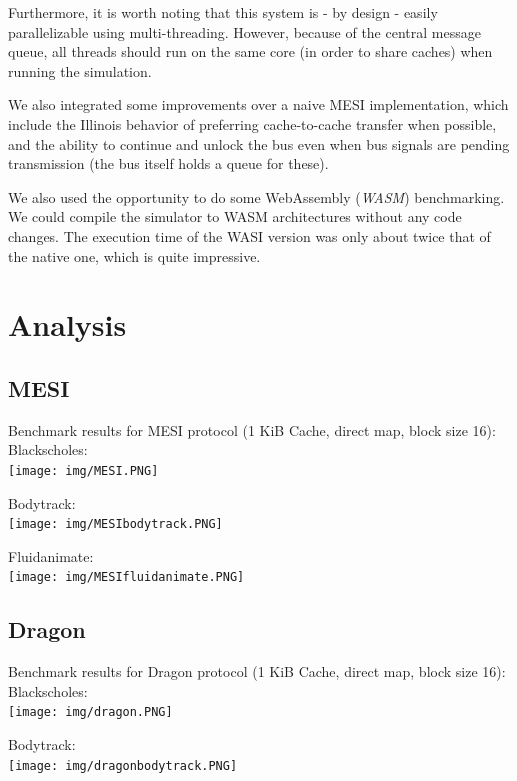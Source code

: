 \documentclass{article}
\begin{document}
\begin{multicols}{2}
Furthermore, it is worth noting that this system is - by design - easily parallelizable using multi-threading. However, because of the central message queue, all threads should run on the same core (in order to share caches) when running the simulation.

We also integrated some improvements over a naive MESI implementation, which include the Illinois behavior of preferring cache-to-cache transfer when possible, and the ability to continue and unlock the bus even when bus signals are pending transmission (the bus itself holds a queue for these).

We also used the opportunity to do some WebAssembly (\textit{WASM}) benchmarking. We could compile the simulator to WASM architectures without any code changes. The execution time of the WASI version was only about twice that of the native one, which is quite impressive.

\end{multicols}

\section{Analysis}

\subsection{MESI}
Benchmark results for MESI protocol (1 KiB Cache, direct map, block size 16):\\

Blackscholes:\\
\texttt{[image: img/MESI.PNG]}

\newpage

Bodytrack:\\
\texttt{[image: img/MESIbodytrack.PNG]}

Fluidanimate:\\
\texttt{[image: img/MESIfluidanimate.PNG]}


\subsection{Dragon}
Benchmark results for Dragon protocol (1 KiB Cache, direct map, block size 16):\\

Blackscholes:\\
\texttt{[image: img/dragon.PNG]}

Bodytrack:\\
\texttt{[image: img/dragonbodytrack.PNG]}
\end{document}
